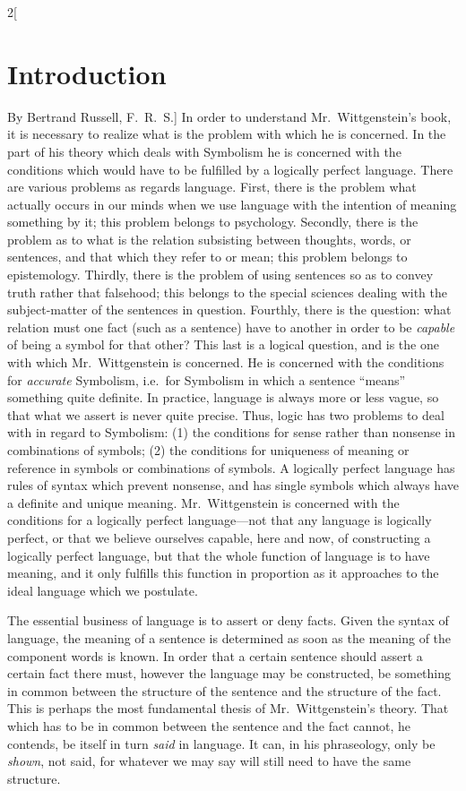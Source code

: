 \documentclass[oneside,openany,12pt]{book}
\begin{document}
\begin{multicols}{2}[\section*{Introduction}By Bertrand Russell, F.\ R.\ S.]
In order to understand Mr.\ Wittgenstein's book, it is necessary to realize what is the problem with which he is concerned. In the part of his theory which deals with Symbolism he is concerned with the conditions which would have to be fulfilled by a logically perfect language. There are various problems as regards language. First, there is the problem what actually occurs in our minds when we use language with the intention of meaning something by it; this problem belongs to psychology. Secondly, there is the problem as to what is the relation subsisting between thoughts, words, or sentences, and that which they refer to or mean; this problem belongs to epistemology. Thirdly, there is the problem of using sentences so as to convey truth rather that falsehood; this belongs to the special sciences dealing with the subject-matter of the sentences in question. Fourthly, there is the question: what relation must one fact (such as a sentence) have to another in order to be \emph{capable} of being a symbol for that other? This last is a logical question, and is the one with which Mr.\ Wittgenstein is concerned. He is concerned with the conditions for \emph{accurate} Symbolism, i.e.\ for Symbolism in which a sentence ``means'' something quite definite. In practice, language is always more or less vague, so that what we assert is never quite precise. Thus, logic has two problems to deal with in regard to Symbolism: (1) the conditions for sense rather than nonsense in combinations of symbols; (2) the conditions for uniqueness of meaning or reference in symbols or combinations of symbols. A logically perfect language has rules of syntax which prevent nonsense, and has single symbols which always have a definite and unique meaning. Mr.\ Wittgenstein is concerned with the conditions for a logically perfect language---not that any language is logically perfect, or that we believe ourselves capable, here and now, of constructing a logically perfect language, but that the whole function of language is to have meaning, and it only fulfills this function in proportion as it approaches to the ideal language which we postulate.

The essential business of language is to assert or deny facts. Given the syntax of language, the meaning of a sentence is determined as soon as the meaning of the component words is known. In order that a certain sentence should assert a certain fact there must, however the language may be constructed, be something in common between the structure of the sentence and the structure of the fact. This is perhaps the most fundamental thesis of Mr.\ Wittgenstein's theory. That which has to be in common between the sentence and the fact cannot, he contends, be itself in turn \emph{said} in language. It can, in his phraseology, only be \emph{shown}, not said, for whatever we may say will still need to have the same structure.


\end{multicols}
\end{document}
